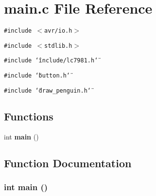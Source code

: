 \section{main.c File Reference}
\label{main_8c}
{\tt \#include $<$avr/io.h$>$}\par
{\tt \#include $<$stdlib.h$>$}\par
{\tt \#include \char`\"{}include/lc7981.h\char`\"{}}\par
{\tt \#include \char`\"{}button.h\char`\"{}}\par
{\tt \#include \char`\"{}draw\_\-penguin.h\char`\"{}}\par
\subsection*{Functions}
\begin{CompactItemize}
\item 
int {\bf main} ()
\end{CompactItemize}


\subsection{Function Documentation}
\subsubsection{\setlength{\rightskip}{0pt plus 5cm}int main ()}\label{main_8c_e66f6b31b5ad750f1fe042a706a4e3d4}


